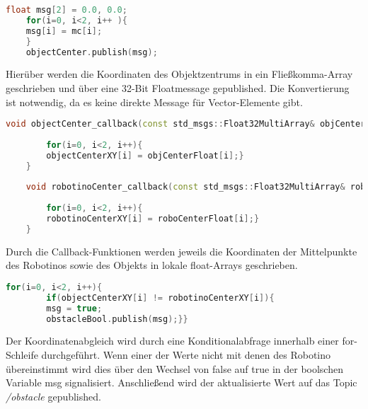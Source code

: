 	 
	\begin{lstlisting}[language = C++]
	float msg[2] = 0.0, 0.0;
	for(i=0, i<2, i++ ){
	msg[i] = mc[i];
	}
	objectCenter.publish(msg);
	\end{lstlisting}
	Hierüber werden die Koordinaten des Objektzentrums in ein Fließkomma-Array geschrieben und über eine 32-Bit Floatmessage gepublished. Die Konvertierung ist notwendig, da es keine direkte Message für Vector-Elemente gibt.
	
	\begin{lstlisting}[language = C++]
	void objectCenter_callback(const std_msgs::Float32MultiArray& objCenterFloat){
	
		for(i=0, i<2, i++){
		objectCenterXY[i] = objCenterFloat[i];}
	}
	
	void robotinoCenter_callback(const std_msgs::Float32MultiArray& roboCenterFloat){
	
		for(i=0, i<2, i++){
		robotinoCenterXY[i] = roboCenterFloat[i];}
	}
	\end{lstlisting}
	Durch die Callback-Funktionen werden jeweils die Koordinaten der Mittelpunkte des Robotinos sowie des Objekts in lokale float-Arrays geschrieben.
	
	
	\begin{lstlisting}[language=C++]
		for(i=0, i<2, i++){
		if(objectCenterXY[i] != robotinoCenterXY[i]){
		msg = true;
	    obstacleBool.publish(msg);}}

	\end{lstlisting}
	Der Koordinatenabgleich wird durch eine Konditionalabfrage innerhalb einer for-Schleife durchgeführt. Wenn einer der Werte nicht mit denen des Robotino übereinstimmt wird dies über den Wechsel von false auf true in der boolschen Variable msg signalisiert. Anschließend wird der aktualisierte Wert auf das Topic \textit{/obstacle} gepublished.

	 